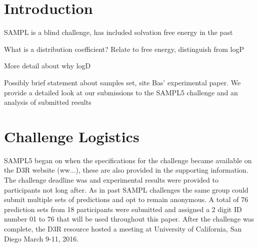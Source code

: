 \date{Received: date / Accepted: date}


\maketitle

\begin{abstract}
\end{abstract}



\section{Introduction}
\label{intro}
SAMPL is a blind challenge, has included solvation free energy in the past

What is a distribution coefficient? Relate to free energy, distinguish from logP

More detail about why logD

Possibly brief statement about samples set, site Bas' experimental paper. We provide a detailed look at our submissions to the SAMPL5 challenge and an analysis of submitted results


\section{Challenge Logistics}
\label{logistics}
SAMPL5 began on %
when the specifications for the challenge became available on the D3R website (ww...), these are also provided in the supporting information.  %
The challenge deadline was %
and experimental results were provided to participants not long after. 
As in past SAMPL challenges the same group could submit multiple sets of predictions and opt to remain anonymous. 
A total of 76 prediction sets from 18 participants were submitted and assigned a 2 digit ID number 01 to 76 that will be used throughout this paper. 
After the challenge was complete, the D3R resource hosted a meeting at University of California, San Diego March 9-11, 2016. %

